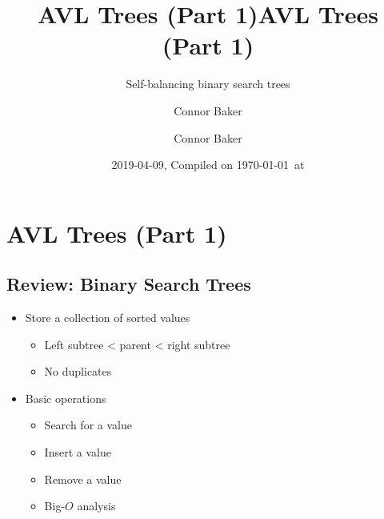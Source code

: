\documentclass[
  10pt,
  english,
  letterpaper,
,tablecaptionabove
]{scrartcl}
\title{AVL Trees (Part 1)}
\subtitle{Self-balancing binary search trees}
\author{Connor Baker}
\date{2019-04-09, Compiled on \today~at \currenttime}
\title{AVL Trees (Part 1)}
\author{Connor Baker}
\providecommand{\tightlist}{%
  \setlength{\itemsep}{0pt}\setlength{\parskip}{0pt}}
\begin{document}

\begin{titlepage}
\afterpage{\restorepagecolor}
\newcommand{\colorRule}[3][black]{\textcolor[HTML]{#1}{\rule{#2}{#3}}}
\end{titlepage}
\restoregeometry




\hypertarget{avl-trees-part-1}{%
\section{AVL Trees (Part 1)}\label{avl-trees-part-1}}

\hypertarget{review-binary-search-trees}{%
\subsection{Review: Binary Search
Trees}\label{review-binary-search-trees}}

\begin{itemize}
\tightlist
\item
  Store a collection of sorted values

  \begin{itemize}
  \tightlist
  \item
    Left subtree \textless{} parent \textless{} right subtree
  \item
    No duplicates
  \end{itemize}
\item
  Basic operations

  \begin{itemize}
  \tightlist
  \item
    Search for a value
  \item
    Insert a value
  \item
    Remove a value
  \item
    Big-\(O\) analysis
  \end{itemize}
\end{itemize}
\end{document}
